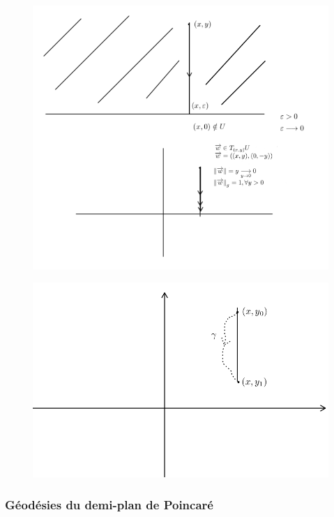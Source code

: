 \documentclass[french]{article}
\theoremstyle{definition}
\begin{document}
\begin{figure}[h!]
  \centering
  \includegraphics[scale=0.2]{figures/horizon1_corr2.png}
  \caption{}
  \label{horizon1}
\end{figure}


\begin{figure}[h!]
  \centering
  \includegraphics[scale=0.3]{figures/horizon2.png}
  \caption{}
  \label{horizon2}
\end{figure}


\subsubsection{G\'eod\'esies du demi-plan de Poincar\'e}
\end{document}
